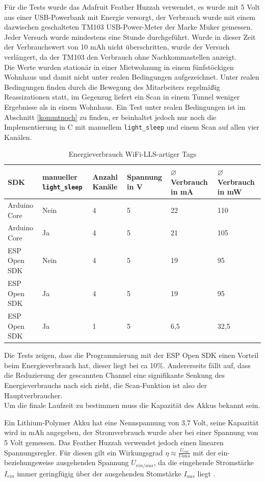 Für die Tests wurde das Adafruit Feather Huzzah verwendet, es wurde mit 5 Volt aus einer USB-Powerbank mit Energie versorgt, der Verbrauch wurde mit einem dazwischen geschalteten TM103 USB-Power-Meter der Marke Muker gemessen. 
Jeder Versuch wurde mindestens eine Stunde durchgeführt.
Wurde in dieser Zeit der Verbrauchswert von 10 mAh nicht überschritten, wurde der Versuch verlängert, da der TM103 den Verbrauch ohne Nachkommastellen anzeigt.\\
Die Werte wurden stationär in einer Mietwohnung in einem fünfstöckigen Wohnhaus und damit nicht unter realen Bedingungen aufgezeichnet.
Unter realen Bedingungen finden durch die Bewegung des Mitarbeiters regelmäßig Reassizationen statt, im Gegenzug liefert ein Scan in einem Tunnel weniger Ergebnisse als in einem Wohnhaus.
Ein Test unter realen Bedingungen ist im Abschnitt \ref{kommtnoch} zu finden, er beinhaltet jedoch nur noch die Implementierung in C mit manuellem \texttt{light\_sleep} und einem Scan auf allen vier Kanälen.

\begin{table}[h]
	\centering
	\caption{Energieverbrauch WiFi-LLS-artiger Tags}
	\label{table:llsconsumption}
	\begin{tabular}{p{3cm}|p{2.2cm}|p{1.5cm}|p{2cm}|p{2cm}|p{2cm}}
		SDK & manueller \texttt{light\_sleep} & Anzahl Kanäle & Spannung in V & $\varnothing$ Verbrauch in mA & $\varnothing$ Verbrauch in mW \\
		\hline
		Arduino Core & Nein & 4 & 5 & 22 & 110 \\
		Arduino Core & Ja & 4 & 5 & 21 & 105 \\
		ESP Open SDK & Nein & 4 & 5 & 19 & 95 \\
		ESP Open SDK & Ja & 4 & 5 & 19 & 95 \\
		\hline
		ESP Open SDK & Ja & 1 & 5 & 6,5 & 32,5 \\
	\end{tabular}
\end{table}

Die Tests zeigen, dass die Programmierung mit der ESP Open SDK einen Vorteil beim Energieverbrauch hat, dieser liegt bei ca 10\%.
Andererseits fällt auf, dass die Reduzierung der gescannten Channel eine signifikante Senkung des Energieverbrauchs nach sich zieht, die Scan-Funktion ist also der Hauptverbraucher.\\
Um die finale Laufzeit zu bestimmen muss die Kapazität des Akkus bekannt sein.

Ein Lithium-Polymer Akku hat eine Nennspannung von 3,7 Volt, seine Kapazität wird in mAh angegeben, der Stromverbrauch wurde aber bei einer Spannung von 5 Volt gemessen. 
Das Feather Huzzah verwendet jedoch einen linearen Spannungsregler.
Für diesen gilt ein Wirkungsgrad $\eta \approx \frac{U_{ein}}{U{aus}}$ mit der ein- beziehungsweise ausgehenden Spannung $U_{ein/aus}$, da die eingehende Stromstärke $I_{ein}$ immer geringfügig über der ausgehenden Stomstärke $I_{aus}$ liegt \cite{streichert2012elektrik}.


